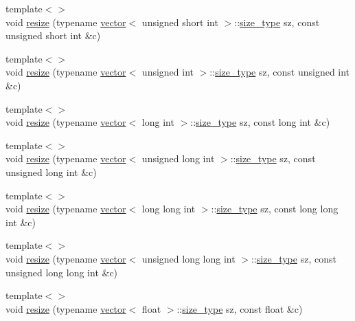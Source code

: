 \begin{DoxyCompactItemize}
{\footnotesize template$<$$>$ }\\void \mbox{\hyperlink{classvector_a98d545ca3647c39746cc2571e03b5f88}{resize}} (typename \mbox{\hyperlink{classvector}{vector}}$<$ unsigned short int $>$\+::\mbox{\hyperlink{classvector_ada51e68d31936547d3729c82daf6b7c6}{size\+\_\+type}} sz, const unsigned short int \&c)
\item 
{\footnotesize template$<$$>$ }\\void \mbox{\hyperlink{classvector_a64ca11035dbbce481166e55004dbf19b}{resize}} (typename \mbox{\hyperlink{classvector}{vector}}$<$ unsigned int $>$\+::\mbox{\hyperlink{classvector_ada51e68d31936547d3729c82daf6b7c6}{size\+\_\+type}} sz, const unsigned int \&c)
\item 
{\footnotesize template$<$$>$ }\\void \mbox{\hyperlink{classvector_a4b7ebcb292ac484b69a8f08d4b77b12f}{resize}} (typename \mbox{\hyperlink{classvector}{vector}}$<$ long int $>$\+::\mbox{\hyperlink{classvector_ada51e68d31936547d3729c82daf6b7c6}{size\+\_\+type}} sz, const long int \&c)
\item 
{\footnotesize template$<$$>$ }\\void \mbox{\hyperlink{classvector_a731e1b028c5b395b29284a00e39090fd}{resize}} (typename \mbox{\hyperlink{classvector}{vector}}$<$ unsigned long int $>$\+::\mbox{\hyperlink{classvector_ada51e68d31936547d3729c82daf6b7c6}{size\+\_\+type}} sz, const unsigned long int \&c)
\item 
{\footnotesize template$<$$>$ }\\void \mbox{\hyperlink{classvector_a18f0d8b07c4c3a644d8375eeeaadb2a3}{resize}} (typename \mbox{\hyperlink{classvector}{vector}}$<$ long long int $>$\+::\mbox{\hyperlink{classvector_ada51e68d31936547d3729c82daf6b7c6}{size\+\_\+type}} sz, const long long int \&c)
\item 
{\footnotesize template$<$$>$ }\\void \mbox{\hyperlink{classvector_af4e5bb55ee6a9a39f7b452309d20ea67}{resize}} (typename \mbox{\hyperlink{classvector}{vector}}$<$ unsigned long long int $>$\+::\mbox{\hyperlink{classvector_ada51e68d31936547d3729c82daf6b7c6}{size\+\_\+type}} sz, const unsigned long long int \&c)
\item 
{\footnotesize template$<$$>$ }\\void \mbox{\hyperlink{classvector_ac368b599ffbe5ad6da28a9ca798bc48d}{resize}} (typename \mbox{\hyperlink{classvector}{vector}}$<$ float $>$\+::\mbox{\hyperlink{classvector_ada51e68d31936547d3729c82daf6b7c6}{size\+\_\+type}} sz, const float \&c)

\end{DoxyCompactItemize}
